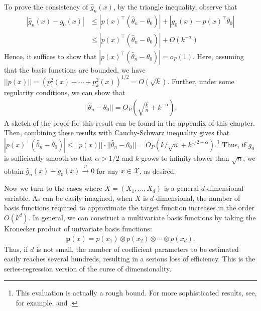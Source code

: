 \documentclass[10.5pt, A4paper, openany, uplatex]{book}
\newcommand{\mbf}{\mathbf}
\newcommand{\mcl}{\mathcal}
\newcommand{\eps}{\varepsilon}
\newcommand{\E}{\mathbb{E}}
\renewcommand{\hat}{\widehat}
\numberwithin{equation}{section}
\begin{document}
To prove the consistency of $\hat g_n(x)$, by the triangle inequality, observe that
\begin{align*}
	|\hat g_n(x) - g_0(x)|
	& \le |p(x)^\top (\hat \theta_n - \theta_0)| + |g_0(x) - p(x)^\top \theta_0| \\
	& \le |p(x)^\top (\hat \theta_n - \theta_0)| + O(k^{-\alpha})
\end{align*}
Hence, it suffices to show that $|p(x)^\top (\hat \theta_n - \theta_0)| = o_P(1)$.
Here, assuming that the basis functions are bounded, we have $||p(x)|| = (p_1^2(x) + \cdots + p_k^2(x))^{1/2} = O(\sqrt{k})$.
Further, under some regularity conditions, we can show that
\begin{align}\label{eq:seriesrate}
		||\hat \theta_n - \theta_0|| = O_P\left( \sqrt{\frac{k}{n}} + k^{-\alpha}\right).
\end{align}
A sketch of the proof for this result can be found in the appendix of this chapter.
Then, combining these results with Cauchy-Schwarz inequality gives that $|p(x)^\top (\hat \theta_n - \theta_0)| \le ||p(x)|| \cdot ||\hat \theta_n - \theta_0 || = O_P(k/\sqrt{n} + k^{1/2 - \alpha})$.\footnote{
	This evaluation is actually a rough bound.
	For more sophisticated results, see, for example, \cite{belloni2015some} and \cite{chen2015optimal}.
}
Thus, if $g_0$ is sufficiently smooth so that $\alpha > 1/2$ and $k$ grows to infinity slower than $\sqrt{n}$, we obtain $\hat g_n(x) - g_0(x) \overset{p}{\to} 0$ for any $x \in \mcl{X}$, as desired.

\bigskip

Now we turn to the cases where $X = (X_1, \ldots, X_d)$ is a general $d$-dimensional variable.
As can be easily imagined, when $X$ is $d$-dimensional, the number of basis functions required to approximate the target function increases in the order $O(k^d)$.
In general, we can construct a multivariate basis functions by taking the Kronecker product of univariate basis functions:
\begin{align*}
	\mbf{p}(x) = p(x_1) \otimes p(x_2) \otimes \cdots \otimes p(x_d).
\end{align*}
Thus, if $d$ is not small, the number of coefficient parameters to be estimated easily reaches several hundreds, resulting in a serious loss of efficiency.
This is the series-regression version of the curse of dimensionality.
\end{document}

